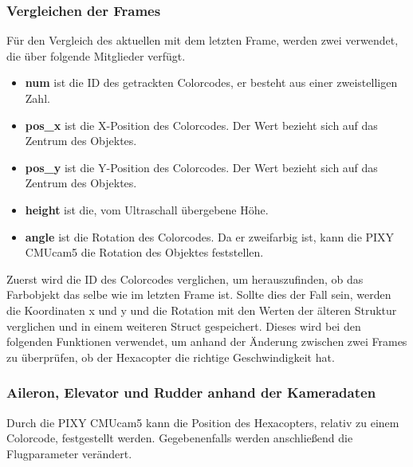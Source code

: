     \subsubsection{Vergleichen der Frames}
    Für den Vergleich des aktuellen mit dem letzten Frame, werden zwei  verwendet, die über folgende Mitglieder verfügt. \cite{Structs}
    \begin{itemize}
      \item \textbf{num} ist die ID des getrackten Colorcodes, er besteht aus einer zweistelligen Zahl.
      \item \textbf{pos\_x} ist die X-Position des Colorcodes. Der Wert bezieht sich auf das Zentrum des Objektes.
      \item \textbf{pos\_y} ist die Y-Position des Colorcodes. Der Wert bezieht sich auf das Zentrum des Objektes.
      \item \textbf{height} ist die, vom Ultraschall übergebene Höhe.
      \item \textbf{angle} ist die Rotation des Colorcodes. Da er zweifarbig ist, kann die PIXY CMUcam5 die Rotation des Objektes feststellen.
    \end{itemize}

    Zuerst wird die ID des Colorcodes verglichen, um herauszufinden, ob das Farbobjekt das selbe wie im letzten Frame ist.
    Sollte dies der Fall sein, werden die Koordinaten x und y und die Rotation mit den Werten der älteren Struktur verglichen und in einem weiteren Struct gespeichert. Dieses wird bei den folgenden Funktionen verwendet, um anhand der Änderung zwischen zwei Frames zu überprüfen, ob der Hexacopter die richtige Geschwindigkeit hat.

    \subsubsection{Aileron, Elevator und Rudder anhand der Kameradaten}
    Durch die PIXY CMUcam5 kann die Position des Hexacopters, relativ zu einem Colorcode, festgestellt werden. Gegebenenfalls werden anschließend die Flugparameter verändert.

